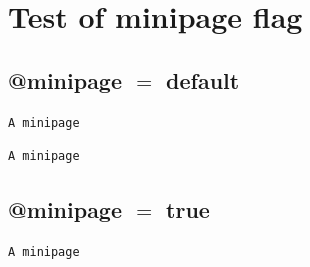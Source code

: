 \documentclass{article}
\def\error#1{\PackageError{caption}{#1}{Blah...}}
\begin{document}
\section{Test of minipage flag}

\subsection{@minipage $=$ default}
\makeatletter
\show\caption@if@minipage
\makeatother

\noindent\begin{minipage}\linewidth
\makeatletter
\if@minipage
{}
\else
\error{@minipage is not set}
\fi
\makeatother
{}
\makeatletter
\if@minipage
\error{@minipage is set}
\else
{}
\fi
\makeatother
\begin{verbatim}
A minipage
\end{verbatim}
\end{minipage}

\bigskip

\noindent\begin{minipage}\linewidth
\makeatletter
\if@minipage
{}
\else
\error{@minipage is not set}
\fi
\makeatother
{}
\makeatletter
\if@minipage
{}
\else
{}
\fi
\makeatother
\begin{verbatim}
A minipage
\end{verbatim}
\end{minipage}

\subsection{@minipage $=$ true}

\captionsetup{@minipage=true}
\makeatletter
\show\caption@if@minipage
\makeatother

\noindent\begin{minipage}\linewidth
\makeatletter
\if@minipage
{}
\else
\error{@minipage is not set}
\fi
\makeatother
{}
\makeatletter
\if@minipage
{}
\else
\error{@minipage is not set}
\fi
\makeatother
\begin{verbatim}
A minipage
\end{verbatim}
\end{minipage}
\end{document}
